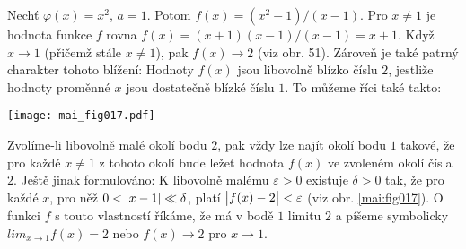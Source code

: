 \begin{mdframed}[style=mdexam]
  \begin{example}\label{MAI:exam028}
    Nechť \(\varphi(x) = x^2\), \(a = 1\). Potom \(f(x) = (x^2 - 1 )/(x - 1)\). Pro \(x \neq 1\) je
    hodnota funkce \(f\) rovna \(f(x) = (x + 1) (x - 1 )/(x - 1) = x + 1\). Když \(x \rightarrow 1\)
    (přičemž stále \(x \neq 1\)), pak \(f(x) \rightarrow 2\) (viz obr. 51). Zároveň je také patrný
    charakter tohoto blížení: Hodnoty \(f(x)\) jsou libovolně blízko číslu \(2\), jestliže hodnoty
    proměnné \(x\) jsou dostatečně blízké číslu \(1\). To můžeme říci také takto: 
    
    {\centering
    \captionsetup{type=figure}
      \texttt{[image: mai\_fig017.pdf]}
    \par}
    
    Zvolíme-li libovolně malé okolí bodu \(2\), pak vždy lze najít okolí bodu \(1\) takové, že pro
    každé \(x \neq 1\) z tohoto okolí bude ležet hodnota \(f(x)\) ve zvoleném okolí čísla \(2\).
    Ještě jinak formulováno: K libovolně malému \(\varepsilon > 0\) existuje \(\delta > 0\) tak, že
    pro každé \(x\), pro něž \(0 < \left\lvert x - 1\right\rvert \ll \delta\), platí \(\left\lvert f(x) - 2\right\rvert < \varepsilon\)
    (viz obr. \ref{mai:fig017}). O funkci \(f\) s touto vlastností říkáme, že má v bodě \(1\) limitu
    \(2\) a píšeme symbolicky \(lim_{x \to 1}f(x) = 2\) nebo \(f(x) \rightarrow 2\) pro \(x
    \rightarrow 1\).
  \end{example}
\end{mdframed}















